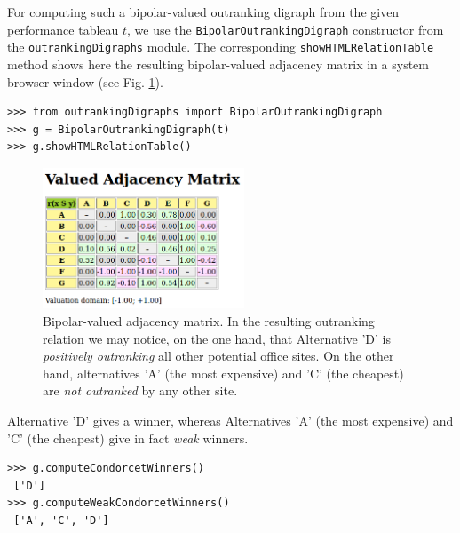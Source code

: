For computing such a bipolar-valued outranking digraph from the given performance tableau $t$, we use the \texttt{BipolarOutrankingDigraph} constructor from the \texttt{outrankingDigraphs} module. The corresponding \texttt{showHTMLRelationTable} method shows here the resulting bipolar-valued adjacency matrix in a system browser window (see Fig. \ref{fig:6.2}).
\begin{lstlisting}
>>> from outrankingDigraphs import BipolarOutrankingDigraph
>>> g = BipolarOutrankingDigraph(t)
>>> g.showHTMLRelationTable()
\end{lstlisting}
\begin{figure}[h]
\sidecaption[t]
\includegraphics[width=6cm]{Figures/officeChoiceOutranking.png}
\caption{Bipolar-valued adjacency matrix. In the resulting outranking relation we may notice, on the one hand, that Alternative 'D' is \emph{positively outranking} all other potential office sites. On the other hand, alternatives 'A' (the most expensive) and 'C' (the cheapest) are \emph{not outranked} by any other site.}
\label{fig:6.2}       %
\end{figure}
Alternative 'D' gives a \Condorcet winner, whereas Alternatives 'A' (the most expensive) and 'C' (the cheapest) give in fact \emph{weak} \Condorcet winners.
\begin{lstlisting}
>>> g.computeCondorcetWinners()
 ['D']
>>> g.computeWeakCondorcetWinners()
 ['A', 'C', 'D']
\end{lstlisting}

